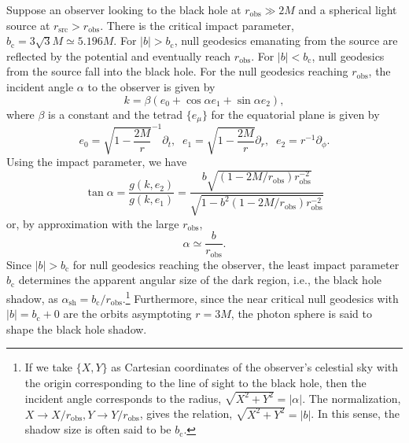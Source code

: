 \documentclass[prd,showpacs,preprintnumbers,groupedaddress,superscriptaddress,nofootinbib,11pt]{revtex4-1} %
\theoremstyle{newplain}
\newcommand{\mr}[1]{\mathrm{#1}}
\begin{document}
\par
Suppose an observer looking to the black hole at $r_{\mr{obs}}\gg2M$ and a spherical light source at $r_{\mr{src}}>r_{\mr{obs}}$.
There is the critical impact parameter, $b_\text{c}=3\sqrt{3}M \simeq 5.196 M$.
For $|b|>b_\text{c}$, null geodesics emanating from the source are reflected by the potential and eventually reach $r_{\mr{obs}}$.
For $|b|<b_\text{c}$, null geodesics from the source fall into the black hole.
For the null geodesics reaching $r_{\mr{obs}}$, the incident angle $\alpha$ to the observer is given by
\begin{equation}
k=\beta(e_0+\cos\alpha e_1+\sin\alpha e_2),
\end{equation}
where $\beta$ is a constant and the tetrad $\{e_\mu\}$ for the equatorial plane is given by
\begin{equation}
e_0=\sqrt{1-\frac{2M}{r}}^{-1}\partial_t,\;\;
e_1=\sqrt{1-\frac{2M}{r}}\partial_r,\;\;
e_2=r^{-1}\partial_\phi.
\end{equation}
Using the impact parameter, we have
\begin{equation}
\tan\alpha = \frac{g(k,e_2)}{g(k,e_1)}
=\frac{b\sqrt{\left(1-2M/r_{\mr{obs}}\right)r_{\mr{obs}}^{-2}}}{\sqrt{1-b^2\left(1-2M/r_{\mr{obs}}\right)r_{\mr{obs}}^{-2}}}
\end{equation}
or, by approximation with the large $r_{\mr{obs}}$,
\begin{equation}
\label{eq:shadow-size}
\alpha\simeq\frac{b}{r_{\mr{obs}}}.
\end{equation}
Since $|b|>b_\text{c}$ for null geodesics reaching the observer, the least impact parameter $b_\text{c}$ determines the apparent angular size of the dark region, i.e., the black hole shadow, as $\alpha_{\mr{sh}}=b_\text{c}/r_{\mr{obs}}$.\footnote{
If we take $\{X,Y\}$ as Cartesian coordinates of the observer's celestial sky with the origin corresponding to the line of sight to the black hole, then the incident angle corresponds to the radius, $\sqrt{X^2+Y^2}=|\alpha|$.
The normalization, $X\to X/r_{\mr{obs}}, Y\to Y/r_{\mr{obs}}$, gives the relation, $\sqrt{X^2+Y^2}=|b|$.
In this sense, the shadow size is often said to be $b_\text{c}$.}
Furthermore, since the near critical null geodesics with $|b|=b_\text{c}+0$ are the orbits asymptoting $r=3M$, the photon sphere is said to shape the black hole shadow.
\end{document}
